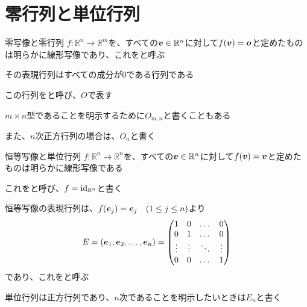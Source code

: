 \documentclass[../../../topic_linear-algebra]{subfiles}
\begin{document}
\sectionline
\section{零行列と単位行列}

\begin{mindflow}
\end{mindflow}

\begin{definition*}{零写像と零行列}
  $f\colon \mathbb{R}^n \to \mathbb{R}^m$を、すべての$\vb*{v} \in \mathbb{R}^n$に対して$f(\vb*{v}) = \vb*{o}$と定めたものは明らかに線形写像であり、これをと呼ぶ

  その表現行列はすべての成分が0である行列である

  この行列をと呼び、$O$で表す
\end{definition*}

$m \times n$型であることを明示するために$O_{m,n}$と書くこともある

また、$n$次正方行列の場合は、$O_n$と書く

\sectionline

\begin{definition*}{恒等写像と単位行列}
  $f\colon \mathbb{R}^n \to \mathbb{R}^n$を、すべての$\vb*{v} \in \mathbb{R}^n$に対して$f(\vb*{v}) = \vb*{v}$と定めたものは明らかに線形写像である

  これをと呼び、$f = \operatorname{id}_{\mathbb{R}^n}$と書く

  恒等写像の表現行列は、$f(\vb*{e}_j) = \vb*{e}_j \quad (1 \leq j \leq n)$より
  \begin{equation*}
    E = (\vb*{e}_1, \vb*{e}_2, \dots, \vb*{e}_n) = \begin{pmatrix}
      1      & 0      & \dots  & 0      \\
      0      & 1      & \dots  & 0      \\
      \vdots & \vdots & \ddots & \vdots \\
      0      & 0      & \dots  & 1
    \end{pmatrix}
  \end{equation*}
  であり、これをと呼ぶ
\end{definition*}

単位行列は正方行列であり、$n$次であることを明示したいときは$E_n$と書く
\end{document}
